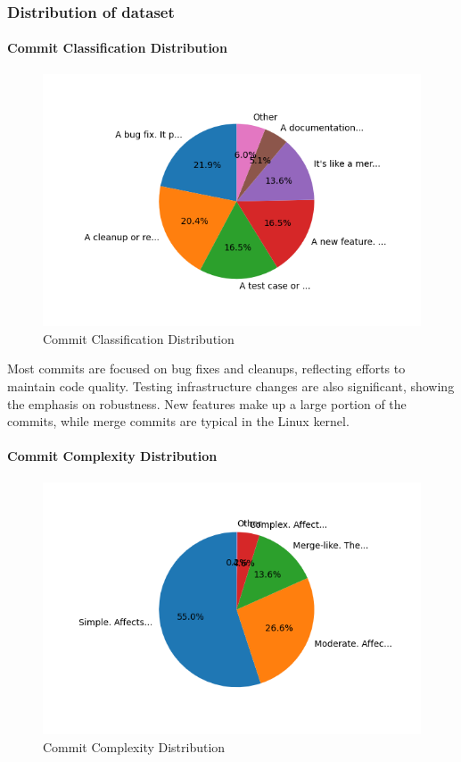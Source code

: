 \subsubsection{Distribution of dataset}

\paragraph{Commit Classification Distribution}
\begin{figure}[ht]
    \centering
    \includegraphics[width=\linewidth]{feature-analysis/commit_pie_chart_commit_classification.png}
    \caption{Commit Classification Distribution}
    \label{fig:commit_pie_chart_commit_classification}
\end{figure}

Most commits are focused on bug fixes and cleanups, reflecting efforts to maintain code quality. Testing infrastructure changes are also significant, showing the emphasis on robustness. New features make up a large portion of the commits, while merge commits are typical in the Linux kernel.

\paragraph{Commit Complexity Distribution}
\begin{figure}[ht]
    \centering
    \includegraphics[width=\linewidth]{feature-analysis/commit_pie_chart_commit_complexity.png}
    \caption{Commit Complexity Distribution}\label{fig:commit_pie_chart_commit_complexity}
\end{figure}

